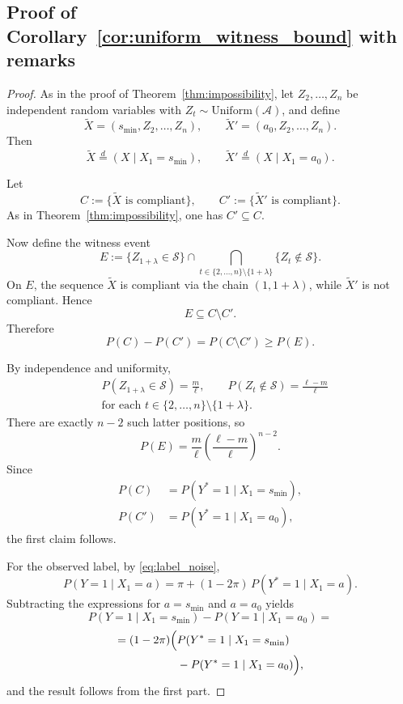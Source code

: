 \documentclass{article} %
\theoremstyle{plain}
\theoremstyle{definition}
\theoremstyle{remark}
\begin{document}
\subsection{Proof of Corollary~\ref{cor:uniform_witness_bound} with remarks}
\label{appendix:proof_uniform_witness_bound}
\begin{proof}
As in the proof of Theorem~\ref{thm:impossibility}, let
$Z_2,\ldots,Z_n$ be independent random variables with
$Z_t\sim \mathrm{Uniform}(\mathcal{A})$, and define
\[
\widetilde X=(s_{\min},Z_2,\ldots,Z_n),
\qquad
\widetilde X'=(a_0,Z_2,\ldots,Z_n).
\]
Then
\[
\widetilde X \stackrel{d}{=} (X\mid X_1=s_{\min}),
\qquad
\widetilde X' \stackrel{d}{=} (X\mid X_1=a_0).
\]

Let
\[
C:=\{\widetilde X \text{ is compliant}\},
\qquad
C':=\{\widetilde X' \text{ is compliant}\}.
\]
As in Theorem~\ref{thm:impossibility}, one has $C'\subseteq C$.

Now define the witness event
\[
E
:=
\{Z_{1+\lambda}\in\mathcal{S}\}
\cap
\bigcap_{t\in\{2,\ldots,n\}\setminus\{1+\lambda\}}
\{Z_t\notin\mathcal{S}\}.
\]
On $E$, the sequence $\widetilde X$ is compliant via the chain
$(1,1+\lambda)$, while $\widetilde X'$ is not compliant. Hence
\[
E \subseteq C\setminus C'.
\]
Therefore
\[
P(C)-P(C') = P(C\setminus C') \ge P(E).
\]

By independence and uniformity,
\[
\begin{aligned}
&P(Z_{1+\lambda}\in\mathcal{S})=\frac{m}{\ell},
\qquad
P(Z_t\notin\mathcal{S})=\frac{\ell-m}{\ell}\\
&\text{for each } t\in\{2,\ldots,n\}\setminus\{1+\lambda\}.
\end{aligned}
\]
There are exactly $n-2$ such latter positions, so
\[
P(E)
=
\frac{m}{\ell}\left(\frac{\ell-m}{\ell}\right)^{n-2}.
\]
Since
\[
\begin{aligned}
P(C)&=P(Y^*=1\mid X_1=s_{\min}),\\
P(C')&=P(Y^*=1\mid X_1=a_0),
\end{aligned}
\]
the first claim follows.

For the observed label, by \eqref{eq:label_noise},
\[
P(Y=1\mid X_1=a)
=
\pi + (1-2\pi)\,P(Y^*=1\mid X_1=a).
\]
Subtracting the expressions for $a=s_{\min}$ and $a=a_0$ yields
\[
P(Y=1\mid X_1=s_{\min})
-
P(Y=1\mid X_1=a_0)
=
\]
\[
\begin{aligned}
= (1-2\pi)\Bigl(
&P(Y^*=1\mid X_1=s_{\min})\\
&-
P(Y^*=1\mid X_1=a_0)
\Bigr),
\end{aligned}
\]
and the result follows from the first part.
\end{proof}
\end{document}
